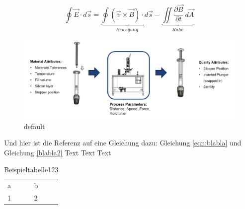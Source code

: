 \begin{equation}
\label{blabla2}
\oint \vec{E} \cdot d\vec{s} = \underbrace{\oint (\vec{v} \times \vec{B}) \cdot d\vec{s}}_{Bewegung} - \underbrace{\iint \frac{\partial \vec{B}}{\partial t} \ d\vec{A}}_{Ruhe}
\end{equation}

\begin{figure}[htbp]
\begin{center}
	\includegraphics[width=\textwidth]{frontpicture.pdf}
\caption{default}
\label{default}
\end{center}
\end{figure}

Und hier ist die Referenz auf eine Gleichung dazu: Gleichung \ref{eqn:blabla} und Gleichung \ref{blabla2} Text Text  Text 

\begin{table}[!htb]
	\centering
		\begin{tabular}{ll}
	  a & b \\
		1 & 2 \\
		\end{tabular}
	\caption{Beispieltabelle123}
	\label{tab:beispieltabelle1}
\end{table}


